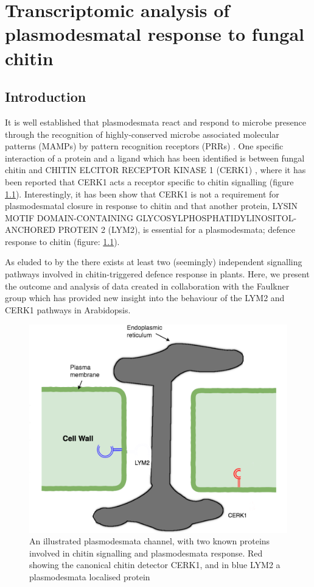 \documentclass[../main.tex]{subfiles}
\begin{document}
\chapter{Transcriptomic analysis of plasmodesmatal response to fungal chitin}
\label{cha:transcripts}

\section{Introduction}
It is well established that plasmodesmata react and respond to microbe presence
through the recognition of highly-conserved microbe associated molecular
patterns (MAMPs) by pattern recognition receptors (PRRs)
\cite{zipfelPlantPatternrecognitionReceptors2014a,
  chevalPlasmodesmalRegulationPlant2018}. One specific interaction of a protein
and a ligand which has been identified is between fungal chitin and CHITIN
ELCITOR RECEPTOR KINASE 1 (CERK1) \cite{miyaCERK1LysMReceptor2007}, where it has
been reported that CERK1 acts a receptor specific to chitin signalling (figure
\ref{fig:receptors}). Interestingly, it has been show that CERK1 is not a
requirement for plasmodesmatal closure in response to chitin and that another
protein, LYSIN MOTIF DOMAIN-CONTAINING GLYCOSYLPHOSPHATIDYLINOSITOL-ANCHORED
PROTEIN 2 (LYM2), is essential for a plasmodesmata; defence response to chitin
\cite{Faulkner2013} (figure: \ref{fig:receptors}).

As eluded to by \citet{Faulkner2013} the there
exists at least two (seemingly) independent signalling pathways involved in
chitin-triggered defence response in plants. Here, we present the outcome and
analysis of data created in collaboration with the Faulkner group which has
provided new insight into the behaviour of the LYM2 and CERK1 pathways in
Arabidopsis.


\begin{figure}[ht]
  \centering
  \includegraphics[width=0.5\columnwidth]{figures/original desmotubule.png}
  \caption[Plasmodesmata, \textit{lym2-1} and\textit{cerk2-1}diagram]{\label{fig:receptors}
    An illustrated plasmodesmata channel, with two
    known proteins involved in chitin signalling and plasmodesmata response. Red
    showing the canonical chitin detector CERK1, and in blue LYM2 a
    plasmodesmata localised protein}
\end{figure}
\end{document}
